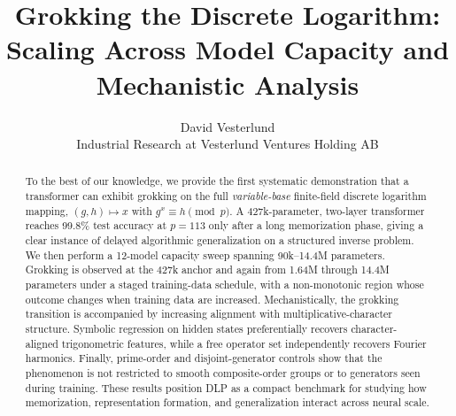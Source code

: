 \documentclass[11pt]{article}
\title{\textbf{Grokking the Discrete Logarithm:\\
Scaling Across Model Capacity and Mechanistic Analysis}}
\author{
David Vesterlund \\
Industrial Research at Vesterlund Ventures Holding AB
}
\date{}
\begin{document}
\maketitle

\begin{abstract}
To the best of our knowledge, we provide the first systematic demonstration that a transformer can exhibit grokking on the full \emph{variable-base} finite-field discrete logarithm mapping, $(g,h)\mapsto x$ with $g^x\equiv h\pmod p$. A 427k-parameter, two-layer transformer reaches 99.8\% test accuracy at $p=113$ only after a long memorization phase, giving a clear instance of delayed algorithmic generalization on a structured inverse problem. We then perform a 12-model capacity sweep spanning 90k--14.4M parameters. Grokking is observed at the 427k anchor and again from 1.64M through 14.4M parameters under a staged training-data schedule, with a non-monotonic region whose outcome changes when training data are increased. Mechanistically, the grokking transition is accompanied by increasing alignment with multiplicative-character structure. Symbolic regression on hidden states preferentially recovers character-aligned trigonometric features, while a free operator set independently recovers Fourier harmonics. Finally, prime-order and disjoint-generator controls show that the phenomenon is not restricted to smooth composite-order groups or to generators seen during training. These results position DLP as a compact benchmark for studying how memorization, representation formation, and generalization interact across neural scale.
\end{abstract}

\begin{center}
\end{center}
\vspace{0.35em}
\end{document}
